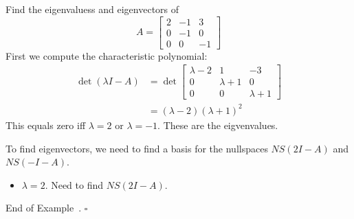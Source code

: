 \documentclass[10pt]{article}
\theoremstyle{definition}
\newtheorem{example}[theorem]{Example}
\renewenvironment{example}
{\begin{oldexample}}
  {\par\smallskip\hfill   End of Example~\theexample. $\square$    \par\end{oldexample}}
\begin{document}
\begin{example}
  Find the eigenvaluess and eigenvectors of
  \begin{equation*}
    A=\begin{bmatrix}
      2&-1&3\\
      0&-1&0\\
      0&0&-1
    \end{bmatrix}
  \end{equation*}
  First we compute the characteristic polynomial:
  \begin{align*}
    \det(\lambda I-A) 
    &=\det
      \begin{bmatrix}
        \lambda-2&1&-3\\
        0&\lambda+1&0\\
        0&0&\lambda+1
      \end{bmatrix}
    \\
    &= (\lambda-2)(\lambda+1)^{2}
\end{align*}
  This equals zero iff $\lambda=2$ or $\lambda=-1$. These are the
  eigvenvalues.

  To find eigenvectors, we need to find a basis for the nullspaces $NS(2I-A)$
  and $NS(-I-A)$.
  \begin{itemize}
    \item $\lambda=2$. Need to find $NS(2I-A)$.


\end{itemize}
\end{example}
\end{document}
